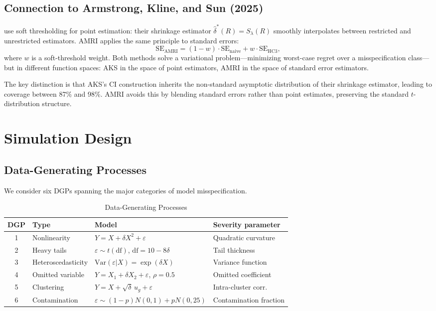\documentclass[12pt]{article}
\theoremstyle{definition}
\theoremstyle{remark}
\newcommand{\Var}{\mathrm{Var}}
\newcommand{\se}{\mathrm{SE}}
\begin{document}
\subsection{Connection to Armstrong, Kline, and Sun (2025)}\label{sec:aks}

\citet{armstrong2025adapting} use soft thresholding for point estimation: their shrinkage estimator $\hat\delta^*(R) = S_\lambda(R)$ smoothly interpolates between restricted and unrestricted estimators. AMRI applies the same principle to standard errors:
\[
\se_{\mathrm{AMRI}} = (1 - w) \cdot \se_{\mathrm{naive}} + w \cdot \se_{\mathrm{HC3}},
\]
where $w$ is a soft-threshold weight. Both methods solve a variational problem---minimizing worst-case regret over a misspecification class---but in different function spaces: AKS in the space of point estimators, AMRI in the space of standard error estimators.

The key distinction is that AKS's CI construction inherits the non-standard asymptotic distribution of their shrinkage estimator, leading to coverage between 87\% and 98\%. AMRI avoids this by blending standard errors rather than point estimates, preserving the standard $t$-distribution structure.


\section{Simulation Design}\label{sec:simulation}

\subsection{Data-Generating Processes}

We consider six DGPs spanning the major categories of model misspecification.

\begin{table}[H]
\centering
\caption{Data-Generating Processes}
\label{tab:dgps}
\small
\begin{tabular}{clll}
\toprule
DGP & Type & Model & Severity parameter \\
\midrule
1 & Nonlinearity & $Y = X + \delta X^2 + \varepsilon$ & Quadratic curvature \\
2 & Heavy tails & $\varepsilon \sim t(\mathrm{df})$, $\mathrm{df} = 10 - 8\delta$ & Tail thickness \\
3 & Heteroscedasticity & $\Var(\varepsilon|X) = \exp(\delta X)$ & Variance function \\
4 & Omitted variable & $Y = X_1 + \delta X_2 + \varepsilon$, $\rho = 0.5$ & Omitted coefficient \\
5 & Clustering & $Y = X + \sqrt{\delta}\, u_g + \varepsilon$ & Intra-cluster corr. \\
6 & Contamination & $\varepsilon \sim (1{-}p)N(0,1) + pN(0,25)$ & Contamination fraction \\
\bottomrule
\end{tabular}
\end{table}
\end{document}
